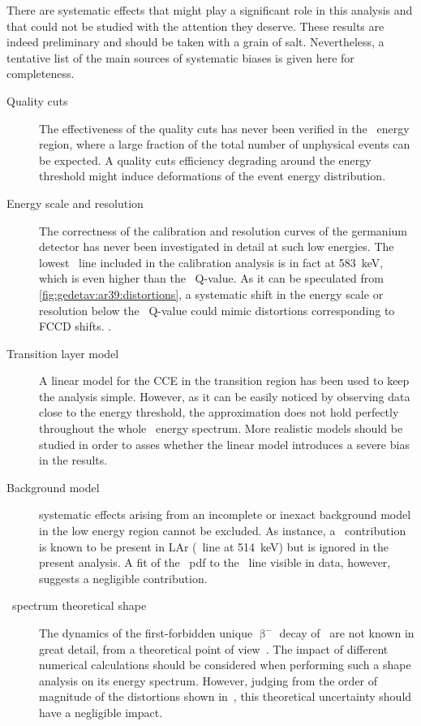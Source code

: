 There are systematic effects that might play a significant role in this analysis and that
could not be studied with the attention they deserve. These results are indeed preliminary
and should be taken with a grain of salt. Nevertheless, a tentative list of the main
sources of systematic biases is given here for completeness.
\begin{description}
  \item[Quality cuts] The effectiveness of the quality cuts has never been verified in the
    \Arl\ energy region, where a large fraction of the total number of unphysical events
    can be expected. A quality cuts efficiency degrading around the energy threshold might
    induce deformations of the event energy distribution.
  \item[Energy scale and resolution] The correctness of the calibration and resolution
    curves of the germanium detector has never been investigated in detail at such low
    energies. The lowest \g\ line included in the calibration analysis is in fact at
    583~keV, which is even higher than the \Arl\ Q-value. As it can be speculated from
    \cref{fig:gedetav:ar39:distortions}, a systematic shift in the energy scale or
    resolution below the \Arl\ Q-value could mimic distortions corresponding to FCCD
    shifts. .
  \item[Transition layer model] A linear model for the CCE in the transition region has
    been used to keep the analysis simple. However, as it can be easily noticed by
    observing data close to the energy threshold, the approximation does not hold
    perfectly throughout the whole \Arl\ energy spectrum. More realistic models should be
    studied in order to asses whether the linear model introduces a severe bias in the
    results.
  \item[Background model] systematic effects arising from an incomplete or inexact
    background model in the low energy region cannot be excluded. As instance, a \Kr\
    contribution is known to be present in LAr (\g\ line at 514~keV) but is ignored in the
    present analysis. A fit of the \Kr\ pdf to the \g\ line visible in data, however,
    suggests a negligible contribution.
  \item[\Arl\ spectrum theoretical shape] The dynamics of the first-forbidden unique
    $\upbeta^-$ decay of \Arl\ are not known in great detail, from a theoretical point of
    view~\cite{Kostensalo2017}. The impact of different numerical calculations should be
    considered when performing such a shape analysis on its energy spectrum. However,
    judging from the order of magnitude of the distortions shown in~\cite{Kostensalo2017},
    this theoretical uncertainty should have a negligible impact.
\end{description}

